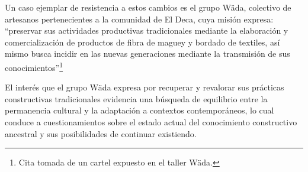 Un caso ejemplar de resistencia a estos cambios es el grupo Wäda, colectivo de artesanos pertenecientes a la comunidad de El Deca, cuya misión expresa: ``preservar sus actividades productivas tradicionales mediante la elaboración y comercialización de productos de fibra de maguey y bordado de textiles, así mismo busca incidir en las nuevas generaciones mediante la transmisión de sus conocimientos''\footnote{Cita tomada de un cartel expuesto en el taller Wäda.}

El interés que el grupo Wäda expresa por recuperar y revalorar sus prácticas constructivas tradicionales evidencia una búsqueda de equilibrio entre la permanencia cultural y la adaptación a contextos contemporáneos, lo cual conduce a cuestionamientos sobre el estado actual del conocimiento constructivo ancestral y sus posibilidades de continuar existiendo.
